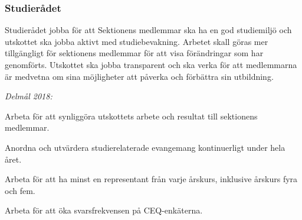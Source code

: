 \documentclass[../_main/handlingar.tex]{subfiles}
\begin{document}
\subsubsection*{Studierådet}
Studierådet jobba för att Sektionens medlemmar ska ha en god studiemiljö och utskottet ska jobba aktivt med studiebevakning. Arbetet skall göras mer tillgängligt för sektionens medlemmar för att visa förändringar som har genomförts. Utskottet ska jobba transparent och ska verka för att medlemmarna är medvetna om sina möjligheter att påverka och förbättra sin utbildning. 

\emph{Delmål 2018:}
\begin{dashlist}
    \item Arbeta för att synliggöra utskottets arbete och resultat till sektionens medlemmar. 
    \item Anordna och utvärdera studierelaterade evangemang kontinuerligt under hela året.
    \item Arbeta för att ha minst en representant från varje årskurs, inklusive årskurs fyra och fem. 
    \item Arbeta för att öka svarsfrekvensen på CEQ-enkäterna.        
\end{dashlist}

\newpage
\end{document}
